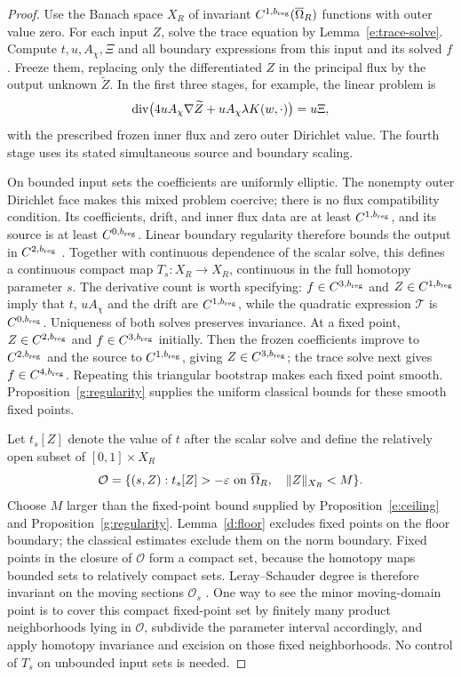 \begin{proof}
Use the Banach space $X_R$ of invariant
$C^{1,b_{\rm reg}}(\overline\Omega_R)$ functions with outer value
zero.  For each input $Z$, solve the trace equation by
Lemma~\ref{e:trace-solve}.  Compute $t,u,A_\chi,\Xi$ and all boundary
expressions from this input and its solved $f$.  Freeze them, replacing
only the differentiated $Z$ in the principal flux by the output
unknown $\widetilde Z$.  In the first three stages, for example, the
linear problem is
\[
 \operatorname{div}\bigl(4uA_\chi\nabla\widetilde Z
               +uA_\chi\lambda K(w,\cdot)\bigr)=u\Xi,
\]
with the prescribed frozen inner flux and zero outer Dirichlet value.
The fourth stage uses its stated simultaneous source and boundary
scaling.

On bounded input sets the coefficients are uniformly elliptic.  The
nonempty outer Dirichlet face makes this mixed problem coercive;
there is no flux compatibility condition.  Its coefficients, drift,
and inner flux data are at least $C^{1,b_{\rm reg}}$, and its source
is at least $C^{0,b_{\rm reg}}$.  Linear boundary regularity therefore
bounds the output in $C^{2,b_{\rm reg}}$
\cite{AgmonDouglisNirenberg1959,GilbargTrudinger2001}.
Together with continuous dependence of the scalar solve, this defines
a continuous compact map $T_s:X_R\to X_R$, continuous in the full
homotopy parameter $s$.  The derivative count is worth specifying:
$f\in C^{3,b_{\rm reg}}$ and $Z\in C^{1,b_{\rm reg}}$ imply that
$t$, $uA_\chi$ and the drift are $C^{1,b_{\rm reg}}$, while the
quadratic expression $\mathcal T$ is $C^{0,b_{\rm reg}}$.
Uniqueness of both solves preserves invariance.  At a fixed point,
$Z\in C^{2,b_{\rm reg}}$ and $f\in C^{3,b_{\rm reg}}$ initially.
Then the frozen coefficients improve to $C^{2,b_{\rm reg}}$ and the
source to $C^{1,b_{\rm reg}}$, giving $Z\in C^{3,b_{\rm reg}}$;
the trace solve next gives $f\in C^{4,b_{\rm reg}}$.  Repeating this
triangular bootstrap makes each fixed point smooth.
Proposition~\ref{g:regularity} supplies the uniform classical bounds
for these smooth fixed points.

Let $t_s[Z]$ denote the value of $t$ after the scalar solve and define
the relatively open subset of $[0,1]\times X_R$
\[
 \mathcal O=\{(s,Z):t_s[Z]>-\varepsilon
               \text{ on }\overline\Omega_R,\quad\|Z\|_{X_R}<M\}.
\]
Choose $M$ larger than the fixed-point bound supplied by
Proposition~\ref{e:ceiling} and Proposition~\ref{g:regularity}.
Lemma~\ref{d:floor} excludes fixed points on the floor boundary;
the classical estimates exclude them on the norm boundary.
Fixed points in the closure of $\mathcal O$ form a compact set,
because the homotopy maps bounded sets to relatively compact sets.
Leray--Schauder degree is therefore invariant on the moving sections
$\mathcal O_s$ \cite{LeraySchauder1934}.  One way to see the minor
moving-domain point is to cover this compact fixed-point set by
finitely many product neighborhoods lying in $\mathcal O$, subdivide
the parameter interval accordingly, and apply homotopy invariance and
excision on those fixed neighborhoods.  No control of $T_s$ on
unbounded input sets is needed.


\end{proof}
